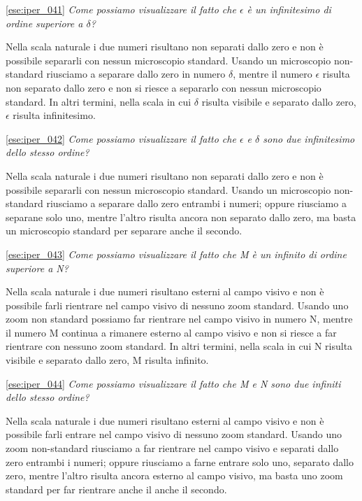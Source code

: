 \ref{ese:iper_041} 
\emph{Come possiamo visualizzare il fatto che \(\epsilon\) è un infinitesimo di 
ordine superiore a \(\delta\)?}

Nella scala naturale i due numeri risultano non separati dallo zero e non è 
possibile separarli con nessun microscopio standard. Usando un microscopio 
non-standard riusciamo a separare dallo zero in numero \(\delta\), mentre il 
numero \(\epsilon\) risulta non separato dallo zero e non si riesce a separarlo 
con nessun microscopio standard. In altri termini, nella scala in cui 
\(\delta\) risulta visibile e separato dallo zero, 
\(\epsilon\) risulta infinitesimo.

\ref{ese:iper_042} 
\emph{Come possiamo visualizzare il fatto che \(\epsilon\) e \(\delta\) sono 
due infinitesimo dello stesso ordine?}

Nella scala naturale i due numeri risultano non separati dallo zero e non è 
possibile separarli con nessun microscopio standard. Usando un microscopio 
non-standard riusciamo a separare dallo zero entrambi i numeri; oppure 
riusciamo a separane solo uno, mentre l'altro risulta ancora non separato dallo 
zero, ma basta un microscopio standard per separare anche il secondo.

\ref{ese:iper_043} 
\emph{Come possiamo visualizzare il fatto che M è un infinito di ordine 
superiore a N?}

Nella scala naturale i due numeri risultano esterni al campo visivo e non è 
possibile farli rientrare nel campo visivo di nessuno zoom standard. Usando uno 
zoom non standard possiamo far rientrare nel campo visivo in numero N, mentre 
il numero M continua a rimanere esterno al campo visivo e non si riesce a far 
rientrare con nessuno zoom standard. In altri termini, nella scala in cui N 
risulta visibile e separato dallo zero, M risulta infinito.

\ref{ese:iper_044} 
\emph{Come possiamo visualizzare il fatto che M e N sono due infiniti dello 
stesso ordine?}

Nella scala naturale i due numeri risultano esterni al campo visivo e non è 
possibile farli entrare nel campo visivo di nessuno zoom standard. Usando uno 
zoom non-standard riusciamo a far rientrare nel campo visivo e separati dallo 
zero entrambi i numeri; oppure riusciamo a farne entrare solo uno, separato 
dallo zero, mentre l'altro risulta ancora esterno al campo visivo, ma basta uno 
zoom standard per far rientrare anche il anche il secondo.

\subsubsection*{}

